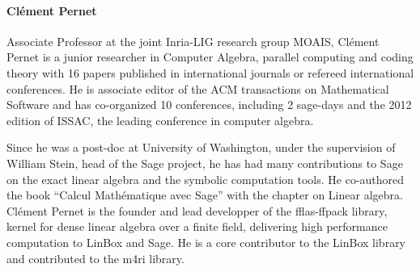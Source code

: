 \paragraph{Cl\'ement Pernet}


Associate Professor at the joint Inria-LIG research group MOAIS, Cl\'ement
Pernet is a junior researcher in Computer Algebra, parallel computing and coding
theory with  16 papers published in international journals or refereed
international conferences. He is associate editor of the
ACM transactions on Mathematical Software and has co-organized 10 conferences,
including 2 sage-days and  the 2012 edition of ISSAC, the leading conference in
computer algebra.

Since he was a post-doc at University of Washington, under the supervision of
William Stein, head of the Sage project, he has had many contributions to Sage on
the exact linear algebra and the symbolic computation tools. He co-authored the
book ``Calcul Mathématique avec Sage'' with the chapter on Linear algebra.
Cl\'ement Pernet is the founder and lead developper of the fflas-ffpack library,
kernel for dense linear algebra over a finite field, delivering high performance
computation to LinBox and Sage. He is a core contributor to the LinBox library
and contributed to the m4ri library.

